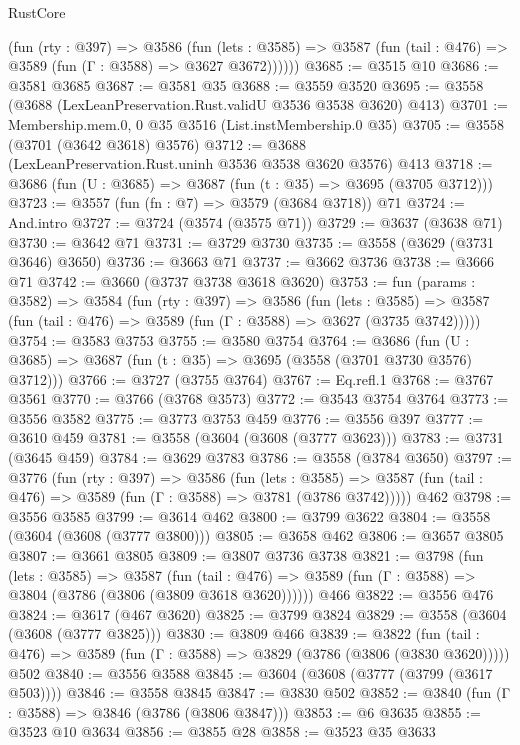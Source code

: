 \begin{lexlean}{RustCore}
\begin{coremodule}
        (fun (rty : @397) =>
        @3586
          (fun (lets : @3585) =>
          @3587 (fun (tail : @476) => @3589 (fun (Γ : @3588) => @3627 @3672))))))
@3685 := @3515 @10
@3686 := @3581 @3685
@3687 := @3581 @35
@3688 := @3559 @3520
@3695 := @3558 (@3688 (LexLeanPreservation.Rust.validU @3536 @3538 @3620) @413)
@3701 := Membership.mem.{0, 0} @35 @3516 (List.instMembership.{0} @35)
@3705 := @3558 (@3701 (@3642 @3618) @3576)
@3712 := @3688 (LexLeanPreservation.Rust.uninh @3536 @3538 @3620 @3576) @413
@3718 := @3686 (fun (U : @3685) => @3687 (fun (t : @35) => @3695 (@3705 @3712)))
@3723 := @3557 (fun (fn : @7) => @3579 (@3684 @3718)) @71
@3724 := And.intro
@3727 := @3724 (@3574 (@3575 @71))
@3729 := @3637 (@3638 @71)
@3730 := @3642 @71
@3731 := @3729 @3730
@3735 := @3558 (@3629 (@3731 @3646) @3650)
@3736 := @3663 @71
@3737 := @3662 @3736
@3738 := @3666 @71
@3742 := @3660 (@3737 @3738 @3618 @3620)
@3753 := fun (params : @3582) =>
  @3584
    (fun (rty : @397) =>
    @3586
      (fun (lets : @3585) =>
      @3587 (fun (tail : @476) => @3589 (fun (Γ : @3588) => @3627 (@3735 @3742)))))
@3754 := @3583 @3753
@3755 := @3580 @3754
@3764 := @3686 (fun (U : @3685) => @3687 (fun (t : @35) => @3695 (@3558 (@3701 @3730 @3576) @3712)))
@3766 := @3727 (@3755 @3764)
@3767 := Eq.refl.{1}
@3768 := @3767 @3561
@3770 := @3766 (@3768 @3573)
@3772 := @3543 @3754 @3764
@3773 := @3556 @3582
@3775 := @3773 @3753 @459
@3776 := @3556 @397
@3777 := @3610 @459
@3781 := @3558 (@3604 (@3608 (@3777 @3623)))
@3783 := @3731 (@3645 @459)
@3784 := @3629 @3783
@3786 := @3558 (@3784 @3650)
@3797 := @3776
    (fun (rty : @397) =>
    @3586
      (fun (lets : @3585) =>
      @3587 (fun (tail : @476) => @3589 (fun (Γ : @3588) => @3781 (@3786 @3742)))))
    @462
@3798 := @3556 @3585
@3799 := @3614 @462
@3800 := @3799 @3622
@3804 := @3558 (@3604 (@3608 (@3777 @3800)))
@3805 := @3658 @462
@3806 := @3657 @3805
@3807 := @3661 @3805
@3809 := @3807 @3736 @3738
@3821 := @3798
    (fun (lets : @3585) =>
    @3587
      (fun (tail : @476) => @3589 (fun (Γ : @3588) => @3804 (@3786 (@3806 (@3809 @3618 @3620))))))
    @466
@3822 := @3556 @476
@3824 := @3617 (@467 @3620)
@3825 := @3799 @3824
@3829 := @3558 (@3604 (@3608 (@3777 @3825)))
@3830 := @3809 @466
@3839 := @3822
    (fun (tail : @476) => @3589 (fun (Γ : @3588) => @3829 (@3786 (@3806 (@3830 @3620)))))
    @502
@3840 := @3556 @3588
@3845 := @3604 (@3608 (@3777 (@3799 (@3617 @503))))
@3846 := @3558 @3845
@3847 := @3830 @502
@3852 := @3840 (fun (Γ : @3588) => @3846 (@3786 (@3806 @3847)))
@3853 := @6 @3635
@3855 := @3523 @10 @3634
@3856 := @3855 @28
@3858 := @3523 @35 @3633

\end{coremodule}
\end{lexlean}
